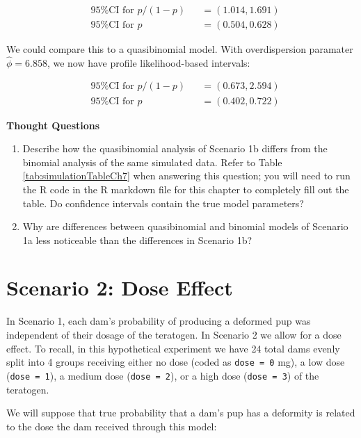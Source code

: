 \documentclass[
]{krantz}
\begin{document}
\[
\begin{alignedat}{2}
  &\textrm{95\% CI for } p/(1-p) &&= (1.014, 1.691) \\
  &\textrm{95\% CI for } p       &&= (0.504, 0.628)
\end{alignedat}
\]

We could compare this to a quasibinomial model. With overdispersion paramater \(\widehat{\phi} = 6.858\), we now have profile likelihood-based intervals:

\[
\begin{alignedat}{2}
  &\textrm{95\% CI for } p/(1-p) &&= (0.673, 2.594) \\
  &\textrm{95\% CI for } p       &&= (0.402, 0.722)
\end{alignedat}
\]

\vspace{5mm}

\textbf{Thought Questions}

\begin{enumerate}
\def\labelenumi{\arabic{enumi}.}
\setcounter{enumi}{3}
\item
  Describe how the quasibinomial analysis of Scenario 1b differs from the binomial analysis of the same simulated data. Refer to Table \ref{tab:simulationTableCh7} when answering this question; you will need to run the R code in the R markdown file for this chapter to completely fill out the table. Do confidence intervals contain the true model parameters?
\item
  Why are differences between quasibinomial and binomial models of Scenario 1a less noticeable than the differences in Scenario 1b?
\end{enumerate}

\section{Scenario 2: Dose Effect}\label{scenario-2-dose-effect}

In Scenario 1, each dam's probability of producing a deformed pup was independent of their dosage of the teratogen. In Scenario 2 we allow for a dose effect. To recall, in this hypothetical experiment we have 24 total dams evenly split into 4 groups receiving either no dose (coded as \texttt{dose\ =\ 0} mg), a low dose (\texttt{dose\ =\ 1}), a medium dose (\texttt{dose\ =\ 2}), or a high dose (\texttt{dose\ =\ 3}) of the teratogen.

We will suppose that true probability that a dam's pup has a deformity is related to the dose the dam received through this model:
\end{document}
